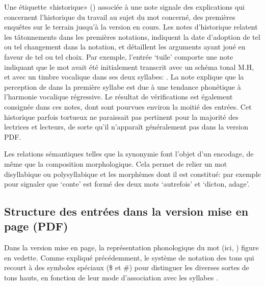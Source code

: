 
Une étiquette «historique» () associée à une note signale des explications qui concernent l'historique du travail au sujet du mot concerné, des premières enquêtes sur le terrain jusqu'à la version en cours. Les notes d'historique relatent les tâtonnements dans les premières notations, indiquent la date d'adoption de tel ou tel changement dans la notation, et détaillent les arguments ayant joué en faveur de tel ou tel choix. Par exemple, l'entrée  ‘tuile’ comporte une note indiquant que le mot avait été initialement transcrit avec un schéma tonal M.H, et avec un timbre vocalique  dans ses deux syllabes: . La note explique que la perception de  dans la première syllabe est due à une tendance phonétique à l'harmonie vocalique régressive. Le résultat de vérifications est également consignée dans ces notes, dont sont pourvues environ la moitié des entrées. Cet historique parfois tortueux ne paraissait pas pertinent pour la majorité des lectrices et lecteurs, de sorte qu'il n'apparaît généralement pas dans la version PDF.

Les relations sémantiques telles que la synonymie font l'objet d'un encodage, de même que la composition morphologique. Cela permet de relier un mot disyllabique ou polysyllabique et les morphèmes dont il est constitué: par exemple pour signaler que  ‘conte’ est formé des deux mots  ‘autrefois’ et  ‘dicton, adage’.


\subsection{Structure des entrées dans la version mise en page (PDF)}
\label{sec:structure_des_entrées}

Dans la version mise en page, la représentation phonologique du mot (ici, ) figure en vedette. Comme expliqué précédemment, le système de notation des tons qui recourt à des symboles spéciaux (\$ et \#) pour distinguer les diverses sortes de tons hauts, en fonction de leur mode d’association avec les syllabes \parencite[80-90]{michaud2017}.

